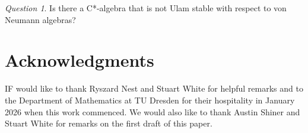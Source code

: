 \documentclass[11pt]{amsproc}
\newcommand{\cstar}{C*}
\theoremstyle{definition}
\theoremstyle{plain}
\theoremstyle{remark}
\newtheorem{question}[definition]{Question}
\begin{document}
\begin{question} Is there a \cstar-algebra that is not Ulam stable with respect to von Neumann algebras?
\end{question}

\section*{Acknowledgments} IF would like to thank Ryszard Nest and Stuart White for helpful remarks  and to the Department of Mathematics at TU Dresden for their hospitality in January 2026 when this work commenced.  We would also like to thank Austin Shiner and Stuart White for remarks on the first draft of this paper. 




\end{document}
